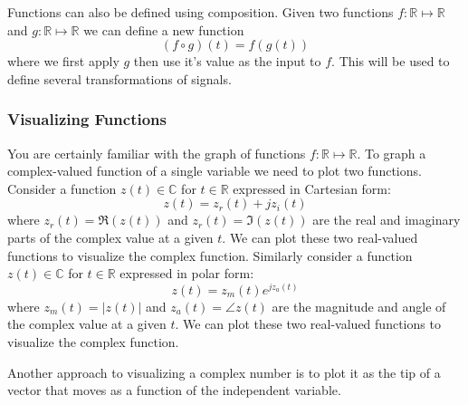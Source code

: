 Functions can also be defined using composition. Given two functions $f:\mathbb{R}\mapsto\mathbb{R}$ and $g:\mathbb{R}\mapsto\mathbb{R}$ we can define a new function
\[
(f \circ g)(t) = f(g(t)) 
\]
where we first apply $g$ then use it's value as the input to $f$. This will be used to define several transformations of signals.

\subsubsection*{Visualizing Functions}

You are certainly familiar with the graph of functions $f:\mathbb{R}\mapsto\mathbb{R}$. To graph a complex-valued function of a single variable we need to plot two functions. Consider a function $z(t) \in \mathbb{C}$ for $t \in \mathbb{R}$ expressed in Cartesian form:
\[
z(t) = z_r(t) + j z_i(t) 
\]
where $z_r(t) = \Re(z(t))$ and $z_r(t) = \Im(z(t))$ are the real and imaginary parts of the complex value at a given $t$. We can plot these two real-valued functions to visualize the complex function. Similarly consider a function $z(t) \in \mathbb{C}$ for $t \in \mathbb{R}$ expressed in polar form:
\[
z(t) = z_m(t) e^{jz_a(t)}
\]
where $z_m(t) = |z(t)|$ and $z_a(t) = \angle z(t)$ are the magnitude and angle of the complex value at a given $t$. We can plot these two real-valued functions to visualize the complex function.

Another approach to visualizing a complex number is to plot it as the tip of a vector that moves as a function of the independent variable.

